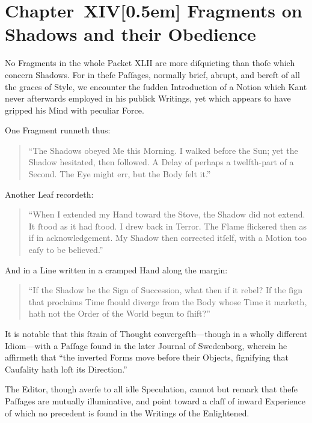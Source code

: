 \documentclass[12pt]{book}
\begin{document}
\chapter*{Chapter~XIV[0.5em]
Fragments on Shadows and their Obedience}


No Fragments in the whole Packet XLII are more diſquieting than thoſe which concern Shadows. For in theſe Paſſages, normally brief, abrupt, and bereft of all the graces of Style, we encounter the ſudden Introduction of a Notion which Kant never afterwards employed in his publick Writings, yet which appears to have gripped his Mind with peculiar Force.

One Fragment runneth thus:

\begin{quote}
``The Shadows obeyed Me this Morning. I walked before the Sun; yet the Shadow hesitated, then followed. A Delay of perhaps a twelfth-part of a Second. The Eye might err, but the Body felt it.''
\end{quote}

Another Leaf recordeth:

\begin{quote}
``When I extended my Hand toward the Stove, the Shadow did not extend. It ſtood as it had ſtood. I drew back in Terror. The Flame flickered then as if in acknowledgement. My Shadow then corrected itſelf, with a Motion too eaſy to be believed.''
\end{quote}

And in a Line written in a cramped Hand along the margin:

\begin{quote}
``If the Shadow be the Sign of Succession, what then if it rebel? If the ſign that proclaims Time ſhould diverge from the Body whose Time it marketh, hath not the Order of the World begun to ſhift?''
\end{quote}

It is notable that this ſtrain of Thought convergeſth—though in a wholly different Idiom—with a Paſſage found in the later Journal of Swedenborg, wherein he affirmeth that ``the inverted Forms move before their Objects, ſignifying that Cauſality hath loſt its Direction.''

The Editor, though averſe to all idle Speculation, cannot but remark that theſe Paſſages are mutually illuminative, and point toward a claſſ of inward Experience of which no precedent is found in the Writings of the Enlightened.
\end{document}
